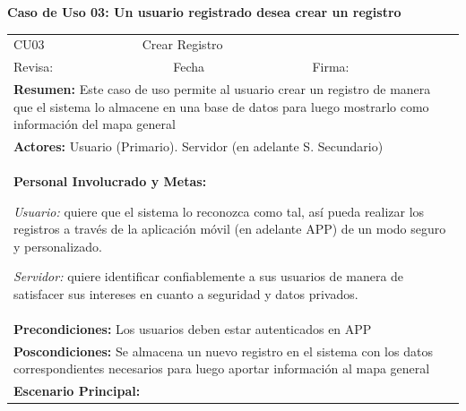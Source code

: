 		\textbf{Caso de Uso 03: Un usuario registrado desea crear un registro}
			\begin{longtable}{|l|p{5.5cm}|l|p{2cm}|l|p{1.9cm}|} \hline
				\cellcolor{grisOscuro} CU03 & \multicolumn{4}{|l|}{  \cellcolor{grisOscuro} Crear Registro} &  \cellcolor{grisClaro}\multirow{2}{1cm}{} \\ \cline{1-5}
				\cellcolor{grisOscuro} Revisa: &  \cellcolor{grisClaro} &  \cellcolor{grisOscuro} Fecha &  \cellcolor{grisClaro} &  \cellcolor{grisOscuro} Firma: & \cellcolor{grisClaro} \\ \hline
				\multicolumn{6}{|p{15cm}|}{ \textbf{Resumen: } Este caso de uso permite al usuario crear un registro de manera que el sistema lo almacene en una base de datos para luego mostrarlo como información del mapa general

				} \\ \hline

				\multicolumn{6}{|p{15cm}|}{ \textbf{Actores: } Usuario (Primario). Servidor (en adelante S. Secundario)

				} \\ \hline

				\multicolumn{6}{|p{15cm}|}{ \textbf{Personal Involucrado y Metas: }

				\emph{Usuario:} quiere que el sistema lo reconozca como tal, así pueda realizar los registros a través de la aplicación móvil (en adelante APP) de un modo seguro y personalizado.

				\emph{Servidor:} quiere identificar confiablemente a sus usuarios de manera de satisfacer sus intereses en cuanto a seguridad y datos privados.

				} \\ \hline

				\multicolumn{6}{|p{15cm}|}{ \textbf{Precondiciones: } Los usuarios deben estar autenticados en APP

				} \\ \hline

				\multicolumn{6}{|p{15cm}|}{ \textbf{Poscondiciones: } Se almacena un nuevo registro en el sistema con los datos correspondientes necesarios para luego aportar información al mapa general

				} \\ \hline

				\multicolumn{6}{|p{15cm}|}{ \textbf{Escenario Principal: }

}
\end{longtable}
